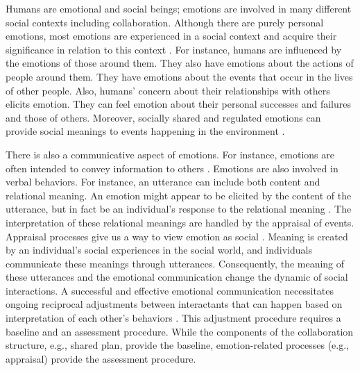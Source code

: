 Humans are emotional and social beings; emotions are involved in many different
social contexts including collaboration. Although there are purely personal
emotions, most emotions are experienced in a social context and acquire their
significance in relation to this context
\cite{parkinson:emotion-social-interaction}. For instance, humans are influenced
by the emotions of those around them. They also have emotions about the actions
of people around them. They have emotions about the events that occur in the 
lives of other people. Also, humans' concern about their relationships with
others elicits emotion. They can feel emotion about their personal successes and
failures and those of others. Moreover, socially shared and regulated emotions
can provide social meanings to events happening in the environment
\cite{wisecup:sociology-emotions}.

There is also a communicative aspect of emotions. For instance, emotions are
often intended to convey information to others \cite{goffman:self-presentation}.
Emotions are also involved in verbal behaviors. For instance, an utterance can
include both content and relational meaning. An emotion might appear to be
elicited by the content of the utterance, but in fact be an individual's
response to the relational meaning \cite{planalp:communicating-emotion}. The
interpretation of these relational meanings are handled by the appraisal of
events. Appraisal processes give us a way to view emotion as social
\cite{hooft:sharing-emotions}. Meaning is created by an individual's social
experiences in the social world, and individuals communicate these meanings
through utterances. Consequently, the meaning of these utterances and the
emotional communication change the dynamic of social interactions. A successful
and effective emotional communication necessitates ongoing reciprocal
adjustments between interactants that can happen based on interpretation of each
other's behaviors \cite{parkinson:emotion-social-interaction}. This adjustment
procedure requires a baseline and an assessment procedure. While the components
of the collaboration structure, e.g., shared plan, provide the baseline,
emotion-related processes (e.g., appraisal) provide the assessment procedure.

